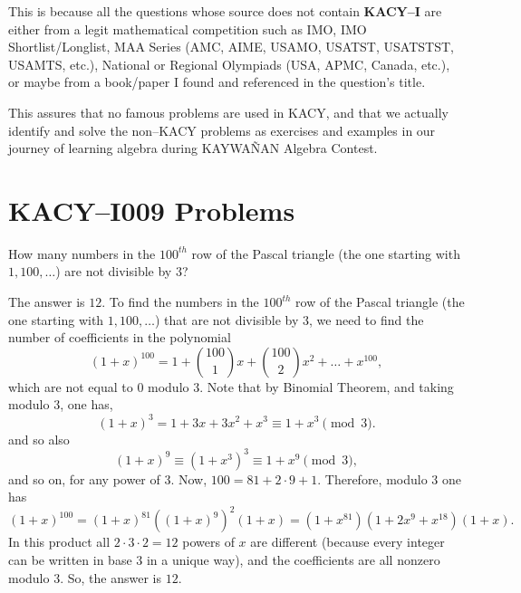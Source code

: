 \documentclass[12pt,a4paper]{memoir}
\theoremstyle{definition}
\begin{document}
	\vspace{0.5em}

	This is because all the questions whose source does not contain \textbf{KACY--I} are either from a legit mathematical competition such as IMO, IMO Shortlist/Longlist, MAA Series (AMC, AIME, USAMO, USATST, USATSTST, USAMTS, etc.), National or Regional Olympiads (USA, APMC, Canada, etc.), or maybe from a book/paper I found and referenced in the question's title. 
	
	\vspace{0.5em}
	
	This assures that no famous problems are used in KACY, and that we actually identify and solve the non--KACY problems as exercises and examples in our journey of learning algebra during KAYWAÑAN Algebra Contest.
	
	\newpage
	
	\section*{KACY--I009 Problems}
	\setcounter{question}{32}
	
	\begin{question}
		How many numbers in the $100^{th}$ row of the Pascal triangle (the one starting with $1, 100, \dots$) are not divisible by $3$?
	\end{question}
	
	\begin{solution}[name=Solution by \href{https://artofproblemsolving.com/community/c4h14275p101907}{Boris}]
		The answer is $12$. To find the numbers in the $100^{th}$ row of the Pascal triangle (the one starting with $1, 100, \dots$) that are not divisible by $3$, we need to find the number of coefficients in the polynomial
		\[ (1+x)^{100}= 1 + {100\choose 1}x + {100\choose 2}x^2 + \dots + x^{100}, \]
		which are not equal to $0$ modulo $3$. Note that by Binomial Theorem, and taking modulo $3$, one has,
		\[(1+x)^3= 1+ 3x+3x^2+ x^3 \equiv 1+x^3 \pmod 3.\]
		and so also
		\[(1+x)^9 \equiv (1+x^3)^3 \equiv 1+x^9 \pmod 3,\]
		and so on, for any power of $3$. Now, $100= 81+2\cdot 9 + 1$. Therefore, modulo $3$ one has
		\[ (1+x)^{100}= (1+x)^{81} \left((1+x)^9\right)^2 (1+x) =
		(1+x^{81}) (1+ 2x^{9} + x^{18}) (1+x). \]
		In this product all $2\cdot 3 \cdot 2=12 $ powers of $x$ are different (because every integer can be written in base $3$ in a unique way), and the coefficients are all nonzero modulo $3$. So, the answer is $12$.
	\end{solution}
	
\end{document}
